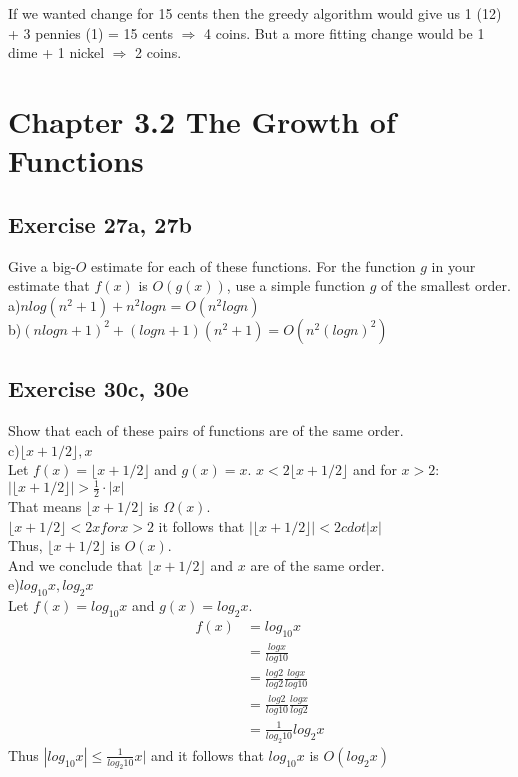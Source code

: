 \documentclass[12pt]{article}
\begin{document}
    If we wanted change for 15 cents then the greedy algorithm would give us
    1 (12) + 3 pennies (1) = 15 cents $\Rightarrow$ 4 coins.
    But a more fitting change would be 1 dime + 1 nickel $\Rightarrow$ 2 coins.


    \pagebreak
    \section{Chapter 3.2 The Growth of Functions}
    \subsection{Exercise 27a, 27b}
    Give a big-$O$ estimate for each of these functions. For the function $g$ in your estimate that $f(x)$ is $O(g(x))$, use a simple function $g$ of the smallest order.\\
    a)$n log(n^2+1)+n^2 log n = O(n^2logn)$\\
    b)$(n log n + 1)^2+(log n+1)(n^2+1)=O(n^2(logn)^2)$

    \subsection{Exercise 30c, 30e}
    Show that each of these pairs of functions are of the same order.\\
    c)$\lfloor x + 1/2 \rfloor,x$\\
    Let $f(x) = \lfloor x + 1/2 \rfloor$ and $g(x)=x$.
    $x<2 \lfloor x+1/2\rfloor$ and for $x>2$: $| \lfloor x +1/2 \rfloor | > \frac{1}{2}\cdot|x|$\\
    That means $\lfloor x+1/2 \rfloor$ is $\Omega(x)$.\\
    $\lfloor x + 1/2 \rfloor <2x for x>2$ it follows that $|\lfloor x+1/2 \rfloor| <2 cdot |x|$\\
    Thus, $\lfloor x+1/2 \rfloor$ is $O(x)$.\\
    And we conclude that $\lfloor x+1/2 \rfloor$ and $x$ are of the same order.\\
    e)$log_{10}x,log_{2}x$\\
    Let $f(x)=log_{10}x$ and $g(x)=log_2x$.
    \begin{equation}
        \begin{split}
            f(x)&=log_{10}x\\
                &=\frac{log x}{log 10}\\
                &=\frac{log 2}{log 2}\frac{log x }{log 10}\\
                &=\frac{log 2}{log 10}\frac{log x}{log 2}\\
                &=\frac{1}{log_{2}10}log_{2}x
        \end{split}
    \end{equation}
    Thus $|log_{10}x| \leq \frac{1}{log_{2}10}x|$ and it follows that $log_{10}x$ is $O(log_2 x)$
\end{document}
